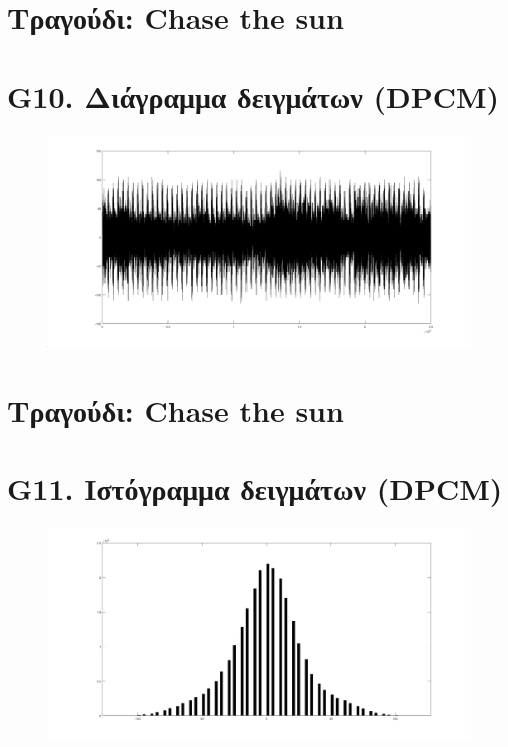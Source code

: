 \documentclass{article}
\begin{document}
\section*{Τραγούδι: Chase the sun}
\section*{G10. Διάγραμμα δειγμάτων (DPCM) }
\begin{figure}[h!]
 \begin{center}
 \advance\leftskip-6cm
  \includegraphics[width=230mm,scale=0.7]{g10s1.jpg}
\end{center}
\end{figure}
\newpage
\section*{Τραγούδι: Chase the sun}
\section*{G11. Ιστόγραμμα δειγμάτων (DPCM) }
\begin{figure}[h!]
 \begin{center}
 \advance\leftskip-6cm
  \includegraphics[width=230mm,scale=0.7]{g11s1.jpg}
\end{center}
\end{figure}
\newpage
\end{document}
